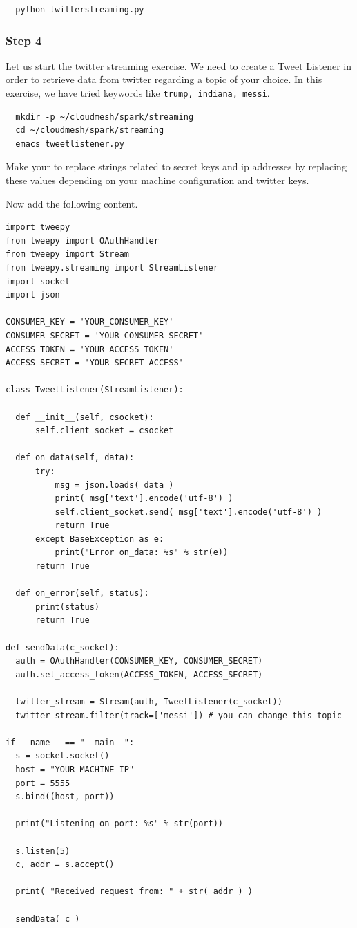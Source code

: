\begin{lstlisting}
  python twitterstreaming.py
\end{lstlisting}

\subsubsection{Step 4}

Let us start the twitter streaming exercise. We need to create a Tweet
Listener in order to retrieve data from twitter regarding a topic of
your choice. In this exercise, we have tried keywords like
\verb|trump, indiana, messi|.

\begin{lstlisting}
  mkdir -p ~/cloudmesh/spark/streaming
  cd ~/cloudmesh/spark/streaming
  emacs tweetlistener.py
\end{lstlisting}

\begin{NOTE}
  Make your to replace strings related to secret keys and ip addresses
  by replacing these values depending on your machine configuration
  and twitter keys.
\end{NOTE}

Now add the following content.

\begin{lstlisting}
import tweepy
from tweepy import OAuthHandler
from tweepy import Stream
from tweepy.streaming import StreamListener
import socket
import json

CONSUMER_KEY = 'YOUR_CONSUMER_KEY'
CONSUMER_SECRET = 'YOUR_CONSUMER_SECRET'
ACCESS_TOKEN = 'YOUR_ACCESS_TOKEN'
ACCESS_SECRET = 'YOUR_SECRET_ACCESS'

class TweetListener(StreamListener):

  def __init__(self, csocket):      
      self.client_socket = csocket

  def on_data(self, data):
      try:
          msg = json.loads( data )
          print( msg['text'].encode('utf-8') )
          self.client_socket.send( msg['text'].encode('utf-8') )
          return True
      except BaseException as e:
          print("Error on_data: %s" % str(e))
      return True

  def on_error(self, status):
      print(status)
      return True

def sendData(c_socket):
  auth = OAuthHandler(CONSUMER_KEY, CONSUMER_SECRET)
  auth.set_access_token(ACCESS_TOKEN, ACCESS_SECRET)

  twitter_stream = Stream(auth, TweetListener(c_socket))
  twitter_stream.filter(track=['messi']) # you can change this topic 

if __name__ == "__main__":
  s = socket.socket()         
  host = "YOUR_MACHINE_IP"      
  port = 5555              
  s.bind((host, port))     

  print("Listening on port: %s" % str(port))

  s.listen(5)              
  c, addr = s.accept()     

  print( "Received request from: " + str( addr ) )

  sendData( c )

\end{lstlisting}


